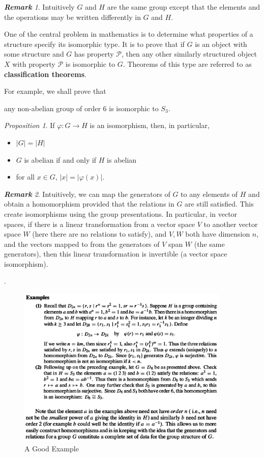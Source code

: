 \documentclass[paper=a4, fontsize=11pt]{scrartcl}
\numberwithin{equation}{section}		%
\numberwithin{figure}{section}			%
\numberwithin{table}{section}				%
\renewcommand{\to}{\ensuremath{\rightarrow}}
\theoremstyle{definition}
\theoremstyle{remark}
\newtheorem*{remark}{\textbf{Remark}}
\theoremstyle{example}
\newtheorem{prop}{Proposition}[section]
\begin{document}
\begin{remark}
    Intuitively $G$ and $H$ are the same group except that the elements and the operations may be written differently in $G$ and $H$.
    
    One of the central problem in mathematics is to determine what properties of a structure specify its isomorphic type. It is to prove that if $G$ is an object with some structure and $G$ has property $\mathcal{P}$, then any other similarly structured object $X$ with property $\mathcal{P}$ is isomorphic to $G$. Theorems of this type are referred to as \textbf{classification theorems}.
    
    For example, we shall prove that
    
    \begin{center}
        any non-abelian group of order $6$ is isomorphic to $S_3$.
    \end{center}
\end{remark}

\begin{prop}
        If $\varphi: G \to H$ is an isomorphism, then, in particular,
    \begin{itemize}
        \item $\lvert G \rvert = \lvert H \rvert$
        \item $G$ is abelian if and only if $H$ is abelian
        \item for all $x \in G$, $\lvert x \rvert = \lvert \varphi(x) \rvert$.
    \end{itemize}
\end{prop}

\begin{remark}
    Intuitively, we can map the generators of $G$ to any elements of $H$ and obtain a homomorphism provided that the relations in $G$ are still satisfied. This create isomorphisms using the group presentations. In particular, in vector spaces, if there is a linear transformation from a vector space $V$ to another vector space $W$ (here there are no relations to satisfy), and $V,W$ both have dimension $n$, and the vectors mapped to from the generators of $V$ span $W$ (the same generators), then this linear transformation is invertible (a vector space isomorphism).
\end{remark}.

\begin{figure}[H]
        \centering
        \includegraphics[width=0.9\textwidth]{1.jpeg}
        \caption{\label{fig:fig1}A Good Example}
\end{figure}


\newpage
\printbibliography
\end{document}
